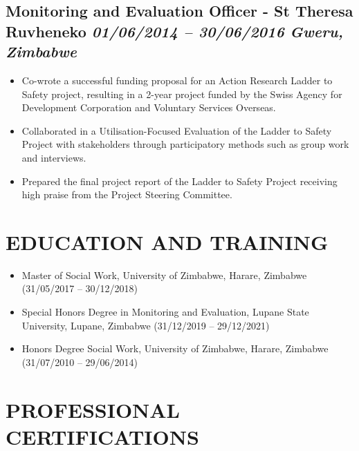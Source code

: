 \documentclass[
  10pt,
]{article}
\providecommand{\tightlist}{%
  \setlength{\itemsep}{0pt}\setlength{\parskip}{0pt}}
\begin{document}
\subsection{\texorpdfstring{Monitoring and Evaluation Officer - St
Theresa Ruvheneko \emph{01/06/2014 -- 30/06/2016} \textbar{}
\emph{Gweru,
Zimbabwe}}{Monitoring and Evaluation Officer - St Theresa Ruvheneko 01/06/2014 -- 30/06/2016 \textbar{} Gweru, Zimbabwe}}\label{monitoring-and-evaluation-officer---st-theresa-ruvheneko-01062014-30062016-gweru-zimbabwe}

\begin{itemize}
\tightlist
\item
  Co-wrote a successful funding proposal for an Action Research Ladder
  to Safety project, resulting in a 2-year project funded by the Swiss
  Agency for Development Corporation and Voluntary Services Overseas.
\item
  Collaborated in a Utilisation-Focused Evaluation of the Ladder to
  Safety Project with stakeholders through participatory methods such as
  group work and interviews.
\item
  Prepared the final project report of the Ladder to Safety Project
  receiving high praise from the Project Steering Committee.
\end{itemize}

\section{EDUCATION AND TRAINING}\label{education-and-training}

\begin{itemize}[itemsep=0.25em, topsep=0.25em]
  \item Master of Social Work, University of Zimbabwe, Harare, Zimbabwe (31/05/2017 – 30/12/2018)  
  \item Special Honors Degree in Monitoring and Evaluation, Lupane State University, Lupane, Zimbabwe (31/12/2019 – 29/12/2021) 
  \item Honors Degree Social Work, University of Zimbabwe, Harare, Zimbabwe (31/07/2010 – 29/06/2014)
\end{itemize}

\section{PROFESSIONAL CERTIFICATIONS}\label{professional-certifications}
\end{document}

